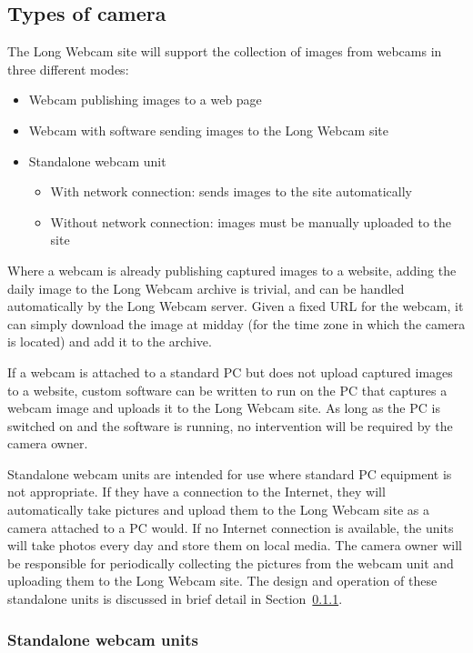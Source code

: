 \documentclass[11pt,a4paper]{article}
\begin{document}
\subsection{Types of camera}
The Long Webcam site will support the collection of images from webcams in three different modes:

\begin{itemize}
\item Webcam publishing images to a web page
\item Webcam with software sending images to the Long Webcam site
\item Standalone webcam unit
    \begin{itemize}
    \item With network connection: sends images to the site automatically
    \item Without network connection: images must be manually uploaded to the site
    \end{itemize}
\end{itemize}

Where a webcam is already publishing captured images to a website, adding the daily image to the Long Webcam archive is trivial, and can be handled automatically by the Long Webcam server. Given a fixed URL for the webcam, it can simply download the image at midday (for the time zone in which the camera is located) and add it to the archive.

If a webcam is attached to a standard PC but does not upload captured images to a website, custom software can be written to run on the PC that captures a webcam image and uploads it to the Long Webcam site. As long as the PC is switched on and the software is running, no intervention will be required by the camera owner.

Standalone webcam units are intended for use where standard PC equipment is not appropriate. If they have a connection to the Internet, they will automatically take pictures and upload them to the Long Webcam site as a camera attached to a PC would. If no Internet connection is available, the units will take photos every day and store them on local media. The camera owner will be responsible for periodically collecting the pictures from the webcam unit and uploading them to the Long Webcam site. The design and operation of these standalone units is discussed in brief detail in Section~\ref{standalone}.

\subsubsection{Standalone webcam units}
\label{standalone}
\end{document}
